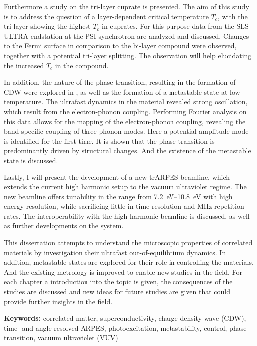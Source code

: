 Furthermore a study on the tri-layer cuprate  is presented.
The aim of this study is to address the question of a layer-dependent critical temperature $T_c$, with the tri-layer showing the highest $T_c$ in cuprates.
For this purpose data from the SLS-ULTRA endstation at the PSI synchrotron are analyzed and discussed.
Changes to the Fermi surface in comparison to the bi-layer compound were observed, together with a potential tri-layer splitting.
The observation will help elucidating the increased $T_c$ in the compound.

In addition, the nature of the phase transition, resulting in the formation of CDW were explored in , as well as the formation of a metastable state at low temperature.
The ultrafast dynamics in the material revealed strong oscillation, which result from the electron-phonon coupling.
Performing Fourier analysis on this data allows for the mapping of the electron-phonon coupling, revealing the band specific coupling of three phonon modes.
Here a potential amplitude mode is identified for the first time.
It is shown that the phase transition is predominantly driven by structural changes.
And the existence of the metastable state is discussed.

Lastly, I will present the development of a new trARPES beamline, which extends the current high harmonic setup to the vacuum ultraviolet regime.
The new beamline offers tunability in the range from \qtyrange{7.2}{10.8}{\electronvolt} with high energy resolution, while sacrificing little in time resolution and \unit{\mega\hertz} repetition rates.
The interoperability with the high harmonic beamline is discussed, as well as further developments on the system. \hfill\break

This dissertation attempts to understand the microscopic properties of correlated materials by investigation their ultrafast out-of-equilibrium dynamics.
In addition, metastable states are explored for their role in controlling the materials.
And the existing metrology is improved to enable new studies in the field.
For each chapter a introduction into the topic is given, the consequences of the studies are discussed and new ideas for future studies are given that could provide further insights in the field.\hfill\break

\textbf{Keywords:} correlated matter, superconductivity, charge density wave (CDW), time- and angle-resolved ARPES, photoexcitation, metastability, control, phase transition, vacuum ultraviolet (VUV)


